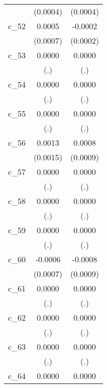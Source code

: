 {\begin{tabular}{l*{2}{c}}
            &    (0.0004)        &    (0.0004)        \\
[1em]
c\_52        &      0.0005        &     -0.0002        \\
            &    (0.0007)        &    (0.0002)        \\
[1em]
c\_53        &      0.0000        &      0.0000        \\
            &         (.)        &         (.)        \\
[1em]
c\_54        &      0.0000        &      0.0000        \\
            &         (.)        &         (.)        \\
[1em]
c\_55        &      0.0000        &      0.0000        \\
            &         (.)        &         (.)        \\
[1em]
c\_56        &      0.0013        &      0.0008        \\
            &    (0.0015)        &    (0.0009)        \\
[1em]
c\_57        &      0.0000        &      0.0000        \\
            &         (.)        &         (.)        \\
[1em]
c\_58        &      0.0000        &      0.0000        \\
            &         (.)        &         (.)        \\
[1em]
c\_59        &      0.0000        &      0.0000        \\
            &         (.)        &         (.)        \\
[1em]
c\_60        &     -0.0006        &     -0.0008        \\
            &    (0.0007)        &    (0.0009)        \\
[1em]
c\_61        &      0.0000        &      0.0000        \\
            &         (.)        &         (.)        \\
[1em]
c\_62        &      0.0000        &      0.0000        \\
            &         (.)        &         (.)        \\
[1em]
c\_63        &      0.0000        &      0.0000        \\
            &         (.)        &         (.)        \\
[1em]
c\_64        &      0.0000        &      0.0000        \\

\end{tabular}}
